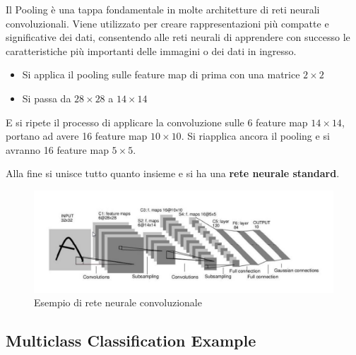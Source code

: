 Il Pooling è una tappa fondamentale in molte architetture di reti neurali
convoluzionali. Viene utilizzato per creare rappresentazioni più compatte e
significative dei dati, consentendo alle reti neurali di apprendere con
successo le caratteristiche più importanti delle immagini o dei dati in
ingresso.

\begin{itemize}
    \item Si applica il pooling sulle feature map di prima con una matrice $2 \times 2$
    \item Si passa da $28 \times 28$ a $14 \times 14$
\end{itemize}

E si ripete il processo di applicare la convoluzione sulle 6 feature map $14
    \times 14$, portano ad avere 16 feature map $10 \times 10$. Si riapplica ancora
il pooling e si avranno 16 feature map $5 \times 5$.

Alla fine si unisce tutto quanto insieme e si ha una \textbf{rete neurale
    standard}.

\begin{figure}[H]
    \begin{center}
        \includegraphics[scale=0.5]{images/conv.png}
        \caption{Esempio di rete neurale convoluzionale}
    \end{center}
\end{figure}

\subsection{Multiclass Classification Example}

